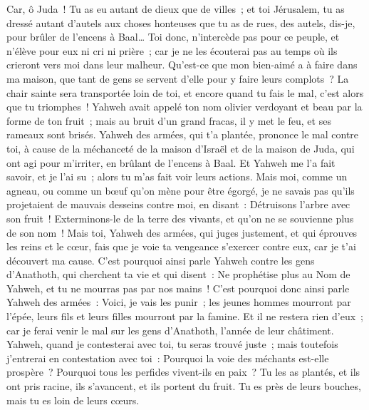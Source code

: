 \begin{multicols}{2}
Car, ô Juda~! Tu as eu autant de dieux que de villes~; et toi Jérusalem, tu as dressé autant d'autels aux choses honteuses que tu as de rues, des autels, dis-je, pour brûler de l'encens à Baal…
Toi donc, n'intercède pas pour ce peuple, et n'élève pour eux ni cri ni prière~; car je ne les écouterai pas au temps où ils crieront vers moi dans leur malheur.
Qu'est-ce que mon bien-aimé a à faire dans ma maison, que tant de gens se servent d'elle pour y faire leurs complots~? La chair sainte sera transportée loin de toi, et encore quand tu fais le mal, c'est alors que tu triomphes~!
Yahweh avait appelé ton nom olivier verdoyant et beau par la forme de ton fruit~; mais au bruit d'un grand fracas, il y met le feu, et ses rameaux sont brisés.
Yahweh des armées, qui t'a plantée, prononce le mal contre toi, à cause de la méchanceté de la maison d'Israël et de la maison de Juda, qui ont agi pour m'irriter, en brûlant de l'encens à Baal.
Et Yahweh me l'a fait savoir, et je l'ai su~; alors tu m'as fait voir leurs actions.
Mais moi, comme un agneau, ou comme un bœuf qu'on mène pour être égorgé, je ne savais pas qu'ils projetaient de mauvais desseins contre moi, en disant~: Détruisons l'arbre avec son fruit~! Exterminons-le de la terre des vivants, et qu'on ne se souvienne plus de son nom~!
Mais toi, Yahweh des armées, qui juges justement, et qui éprouves les reins et le cœur, fais que je voie ta vengeance s'exercer contre eux, car je t'ai découvert ma cause.
C'est pourquoi ainsi parle Yahweh contre les gens d'Anathoth, qui cherchent ta vie et qui disent~: Ne prophétise plus au Nom de Yahweh, et tu ne mourras pas par nos mains~!
C'est pourquoi donc ainsi parle Yahweh des armées~: Voici, je vais les punir~; les jeunes hommes mourront par l'épée, leurs fils et leurs filles mourront par la famine.
Et il ne restera rien d'eux~; car je ferai venir le mal sur les gens d'Anathoth, l'année de leur châtiment.
\VerseOne{}Yahweh, quand je contesterai avec toi, tu seras trouvé juste~; mais toutefois j'entrerai en contestation avec toi~: Pourquoi la voie des méchants est-elle prospère~? Pourquoi tous les perfides vivent-ils en paix~?
Tu les as plantés, et ils ont pris racine, ils s'avancent, et ils portent du fruit. Tu es près de leurs bouches, mais tu es loin de leurs cœurs.

\end{multicols}
